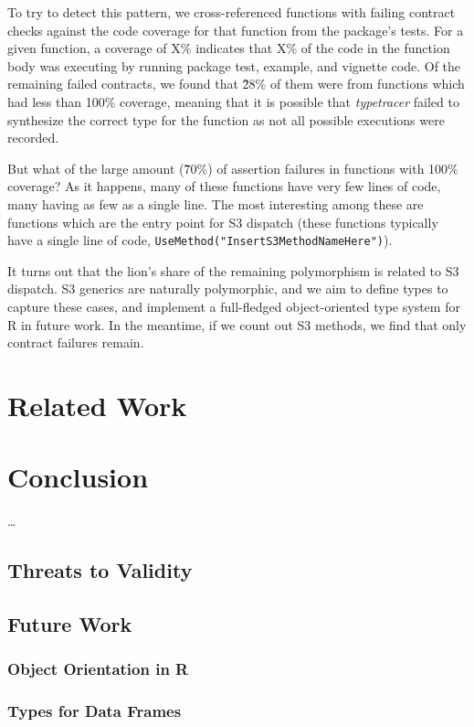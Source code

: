 \documentclass[acmsmall,review,anonymous]{acmart}\settopmatter{printfolios=true,printccs=false,printacmref=false}
\newcommand{\code}[1]{{\lstinline[style=Rin]!#1!}\xspace}
\newcommand{\typetracer}{\emph{typetracer}\xspace} %
\begin{document}
To try to detect this pattern, we cross-referenced functions with failing contract checks against the code coverage for that function from the package's tests.
For a given function, a coverage of X\% indicates that X\% of the code in the function body was executing by running package test, example, and vignette code.
Of the remaining failed contracts, we found that \~28\% of them were from functions which had less than 100\% coverage, meaning that it is possible that \typetracer failed to synthesize the correct type for the function as not all possible executions were recorded.

But what of the large amount (\~70\%) of assertion failures in functions with 100\% coverage?
As it happens, many of these functions have very few lines of code, many having as few as a single line.
The most interesting among these are functions which are the entry point for S3 dispatch (these functions typically have a single line of code, \code{UseMethod("InsertS3MethodNameHere")}).

It turns out that the lion's share of the remaining polymorphism is related to S3 dispatch.
S3 generics are naturally polymorphic, and we aim to define types to capture these cases, and implement a full-fledged object-oriented type system for R in future work.
In the meantime, if we count out S3 methods, we find that only  contract failures remain.

%
%
%
%
%
%
\section{Related Work}
\label{sec:relatedwork}


%
%
%
%
%
%
\section{Conclusion}

\ldots

%
%
%
%
\subsection{Threats to Validity}

%
%
%
%
\subsection{Future Work}

%
%
\subsubsection{Object Orientation in R}

%
%
\subsubsection{Types for Data Frames}

%
%
%


\end{document}
